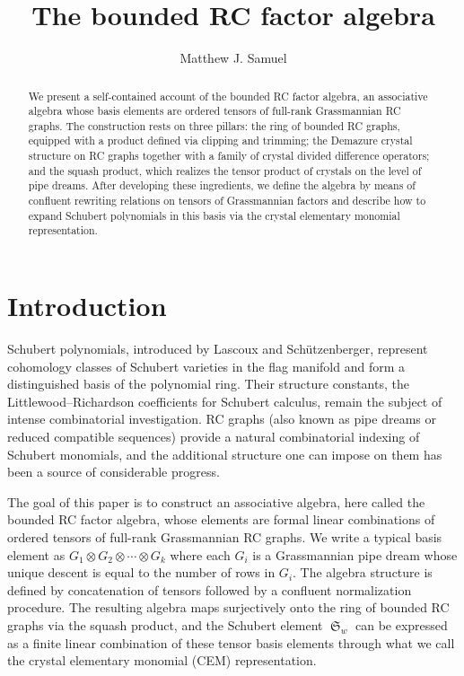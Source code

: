 \documentclass{amsart}
\title{The bounded RC factor algebra}
\author{Matthew J. Samuel}
\theoremstyle{definition}
\theoremstyle{remark}
\numberwithin{equation}{section}
\DeclareMathOperator{\sch}{\mathfrak{S}}
\begin{document}
\begin{abstract}
We present a self-contained account of the bounded RC factor algebra, an associative algebra whose basis elements are ordered tensors of full-rank Grassmannian RC graphs.  The construction rests on three pillars: the ring of bounded RC graphs, equipped with a product defined via clipping and trimming; the Demazure crystal structure on RC graphs together with a family of crystal divided difference operators; and the squash product, which realizes the tensor product of crystals on the level of pipe dreams.  After developing these ingredients, we define the algebra by means of confluent rewriting relations on tensors of Grassmannian factors and describe how to expand Schubert polynomials in this basis via the crystal elementary monomial representation.
\end{abstract}

\maketitle

\section{Introduction}\label{section:intro}

Schubert polynomials, introduced by Lascoux and Sch\"utzenberger, represent cohomology classes of Schubert varieties in the flag manifold and form a distinguished basis of the polynomial ring.  Their structure constants, the Littlewood--Richardson coefficients for Schubert calculus, remain the subject of intense combinatorial investigation.  RC graphs (also known as pipe dreams or reduced compatible sequences) provide a natural combinatorial indexing of Schubert monomials, and the additional structure one can impose on them has been a source of considerable progress.

The goal of this paper is to construct an associative algebra, here called the bounded RC factor algebra, whose elements are formal linear combinations of ordered tensors of full-rank Grassmannian RC graphs.  We write a typical basis element as $G_1 \otimes G_2 \otimes \cdots \otimes G_k$ where each $G_i$ is a Grassmannian pipe dream whose unique descent is equal to the number of rows in $G_i$.  The algebra structure is defined by concatenation of tensors followed by a confluent normalization procedure.  The resulting algebra maps surjectively onto the ring of bounded RC graphs via the squash product, and the Schubert element $\sch_w$ can be expressed as a finite linear combination of these tensor basis elements through what we call the crystal elementary monomial (CEM) representation.
\end{document}
